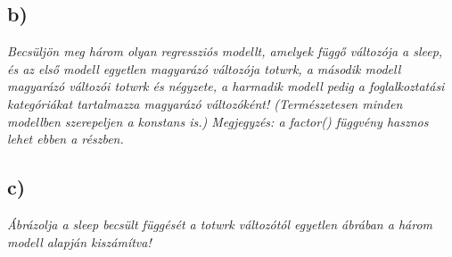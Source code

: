 \documentclass[
]{article}
\newenvironment{Shaded}{\begin{snugshade}}{\end{snugshade}}
\newcommand{\DataTypeTok}[1]{\textcolor[rgb]{0.13,0.29,0.53}{#1}}
\newcommand{\DecValTok}[1]{\textcolor[rgb]{0.00,0.00,0.81}{#1}}
\newcommand{\KeywordTok}[1]{\textcolor[rgb]{0.13,0.29,0.53}{\textbf{#1}}}
\newcommand{\NormalTok}[1]{#1}
\newcommand{\OperatorTok}[1]{\textcolor[rgb]{0.81,0.36,0.00}{\textbf{#1}}}
\newcommand{\StringTok}[1]{\textcolor[rgb]{0.31,0.60,0.02}{#1}}
\begin{document}
\hypertarget{b}{%
\subsection{b)}\label{b}}

\emph{Becsüljön meg három olyan regressziós modellt, amelyek függő
változója a sleep, és az első modell egyetlen magyarázó változója
totwrk, a második modell magyarázó változói totwrk és négyzete, a
harmadik modell pedig a foglalkoztatási kategóriákat tartalmazza
magyarázó változóként! (Természetesen minden modellben szerepeljen a
konstans is.) Megjegyzés: a factor() függvény hasznos lehet ebben a
részben.}

\begin{Shaded}
\end{Shaded}

\hypertarget{c}{%
\subsection{c)}\label{c}}

\emph{Ábrázolja a sleep becsült függését a totwrk változótól egyetlen
ábrában a három modell alapján kiszámítva!}
\end{document}
